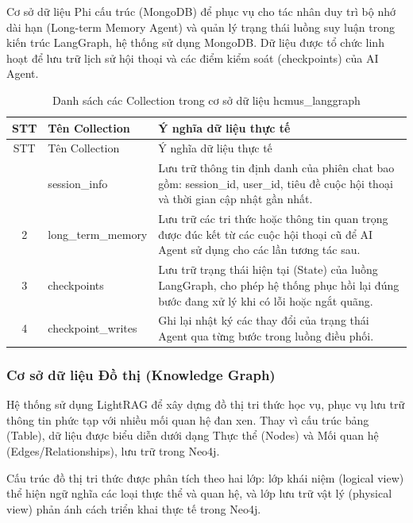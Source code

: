 Cơ sở dữ liệu Phi cấu trúc (MongoDB) để phục vụ cho tác nhân duy trì bộ nhớ dài hạn (Long-term Memory Agent) và quản lý trạng thái luồng suy luận trong kiến trúc LangGraph, hệ thống sử dụng MongoDB. Dữ liệu được tổ chức linh hoạt để lưu trữ lịch sử hội thoại và các điểm kiểm soát (checkpoints) của AI Agent.

{
	\renewcommand{\arraystretch}{1.4}
	\begin{longtable}{|c|p{4.5cm}|p{8.5cm}|}
		\caption{Danh sách các Collection trong cơ sở dữ liệu hcmus\_langgraph} \label{tab:mongo_collections} \\
		\hline
		STT & Tên Collection & Ý nghĩa dữ liệu thực tế \\ \hline
		\endfirsthead
		\hline
		STT & Tên Collection & Ý nghĩa dữ liệu thực tế \\ \hline
		\endhead
		\hline
		\endfoot
		1 & session\_info & Lưu trữ thông tin định danh của phiên chat bao gồm: session\_id, user\_id, tiêu đề cuộc hội thoại và thời gian cập nhật gần nhất. \\ \hline
		2 & long\_term\_memory & Lưu trữ các tri thức hoặc thông tin quan trọng được đúc kết từ các cuộc hội thoại cũ để AI Agent sử dụng cho các lần tương tác sau. \\ \hline
		3 & checkpoints & Lưu trữ trạng thái hiện tại (State) của luồng LangGraph, cho phép hệ thống phục hồi lại đúng bước đang xử lý khi có lỗi hoặc ngắt quãng. \\ \hline
		4 & checkpoint\_writes & Ghi lại nhật ký các thay đổi của trạng thái Agent qua từng bước trong luồng điều phối. \\ \hline
	\end{longtable}
}

\subsubsection{Cơ sở dữ liệu Đồ thị (Knowledge Graph)}
Hệ thống sử dụng LightRAG để xây dựng đồ thị tri thức học vụ, phục vụ lưu trữ thông tin phức tạp với nhiều mối quan hệ đan xen. Thay vì cấu trúc bảng (Table), dữ liệu được biểu diễn dưới dạng Thực thể (Nodes) và Mối quan hệ (Edges/Relationships), lưu trữ trong Neo4j.

Cấu trúc đồ thị tri thức được phân tích theo hai lớp: lớp khái niệm (logical view) thể hiện ngữ nghĩa các loại thực thể và quan hệ, và lớp lưu trữ vật lý (physical view) phản ánh cách triển khai thực tế trong Neo4j.

\setcounter{secnumdepth}{4}
\setcounter{tocdepth}{4}

